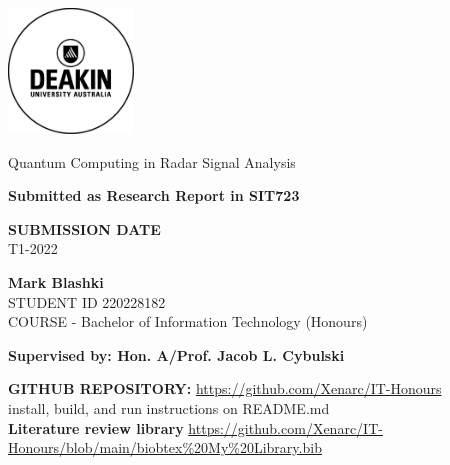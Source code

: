 \documentclass[oneside,12pt]{article}
\theoremstyle{definition}
\theoremstyle{remark}
\begin{document}
\onehalfspacing
\thispagestyle{empty} 
\begin{titlepage}
    \includegraphics[width=0.25\textwidth]{Deakin_Logo.jpeg}
    \begin{center}
       \vspace*{4cm}
       {\LARGE Quantum Computing in Radar Signal Analysis}
       \vspace{3cm}
    \begin{large}   
    
        {\bf Submitted as Research Report in SIT723}
       \vspace{1cm}
        
        {\bf SUBMISSION DATE} \\
        T1-2022
        
       \vspace{3cm}
       \textbf{Mark Blashki}\\
       STUDENT ID 220228182 \\
       COURSE - Bachelor of Information Technology (Honours)
       \vfill
       
       {\bf \normalsize Supervised by: Hon. A/Prof. Jacob L. Cybulski }\\
       
    \end{large}  
   \end{center}
\end{titlepage}

\setlength{\marginparwidth}{4cm}

\newpage 
\textbf{GITHUB REPOSITORY:}
\hyperlink{https://github.com/Xenarc/IT-Honours}{https://github.com/Xenarc/IT-Honours}
\\
install, build, and run instructions on README.md
\\
\textbf{Literature review library}
\hyperlink{https://github.com/Xenarc/IT-Honours/blob/main/biobtex\%20My\%20Library.bib}{https://github.com/Xenarc/IT-Honours/blob/main/biobtex\%20My\%20Library.bib}


\newpage 
\newpage 
\thispagestyle{plain} 

\end{document}
